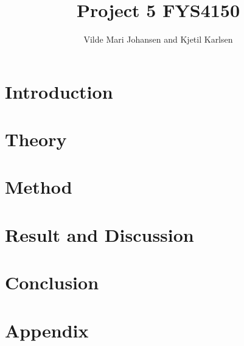 



\title{Project 5 FYS4150}
\author{Vilde Mari Johansen and Kjetil Karlsen}
\raggedbottom



\maketitle

\pagestyle{fancy}



\begin{abstract}







  
\tableofcontents
\end{abstract}


\section{Introduction}


\section{Theory}


\section{Method}


\section{Result and Discussion\label{sec:res}}


%

\section{Conclusion}


\newpage



\section*{Appendix}




